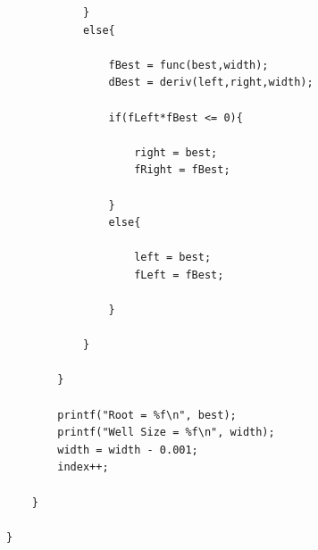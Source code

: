 \documentclass[12pt]{article}
\begin{document}
\begin{verbatim}
			}
			else{

				fBest = func(best,width);
				dBest = deriv(left,right,width);

				if(fLeft*fBest <= 0){

					right = best;
					fRight = fBest;

				}
				else{

					left = best;
					fLeft = fBest;

				}

			}

		}

		printf("Root = %f\n", best);
		printf("Well Size = %f\n", width);
		width = width - 0.001;
		index++;

	}

}
\end{verbatim}
\end{document}
